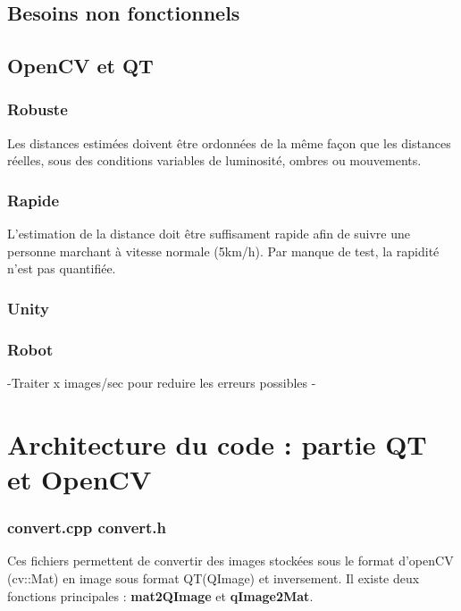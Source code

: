 \documentclass[a4paper]{article}
\begin{document}
\subsection{Besoins non fonctionnels}

\subsection*{OpenCV et QT}

\subsubsection*{Robuste}

Les distances estimées doivent être ordonnées de la même façon que les distances
réelles, sous des conditions variables de luminosité, ombres ou mouvements.

\subsubsection*{Rapide}

L'estimation de la distance doit être suffisament rapide afin de suivre une personne
marchant à vitesse normale (5km/h). Par manque de test, la rapidité n'est pas quantifiée.

\subsubsection*{Unity}


\subsubsection*{Robot}
-Traiter x images/sec pour reduire les erreurs possibles
-



\section{Architecture du code : partie QT et OpenCV}

\subsubsection*{convert.cpp convert.h}

Ces fichiers permettent de convertir des images stockées sous le format d'openCV
(cv::Mat) en image sous format QT(QImage) et inversement. Il existe deux fonctions
principales : \textbf{mat2QImage} et \textbf{qImage2Mat}.
\end{document}
